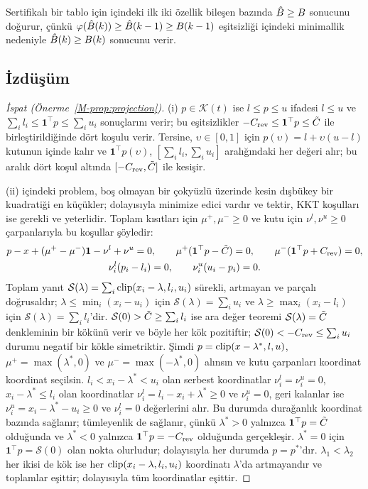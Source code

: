Sertifikalı bir tablo için  içindeki ilk iki özellik bileşen bazında $\hat B\ge B$ sonucunu doğurur, çünkü $\varphi(\hat B(k))\ge\hat B(k-1)\ge B(k-1)$ eşitsizliği  içindeki minimallik nedeniyle $\hat B(k)\ge B(k)$ sonucunu verir.

\subsection{İzdüşüm}\label{app:projection}

\begin{proof}[İspat (Önerme~\ref{M-prop:projection})]
(i) $p\in\mathcal K(t)$ ise $l\le p\le u$ ifadesi $l\le u$ ve $\sum_il_i\le\mathbf 1^\top p\le\sum_iu_i$ sonuçlarını verir; bu eşitsizlikler $-C_{\mathrm{rev}}\le\mathbf 1^\top p\le\tilde C$ ile birleştirildiğinde dört koşulu verir.
Tersine, $\upsilon\in[0,1]$ için $p(\upsilon)=l+\upsilon(u-l)$ kutunun içinde kalır ve $\mathbf 1^\top p(\upsilon)$, $[\sum_il_i,\sum_iu_i]$ aralığındaki her değeri alır; bu aralık dört koşul altında $[-C_{\mathrm{rev}},\tilde C]$ ile kesişir.

(ii)  içindeki problem, boş olmayan bir çokyüzlü üzerinde kesin dışbükey bir kuadratiği en küçükler; dolayısıyla minimize edici vardır ve tektir, KKT koşulları ise gerekli ve yeterlidir.
Toplam kısıtları için $\mu^{+},\mu^{-}\ge0$ ve kutu için $\nu^{l},\nu^{u}\ge0$ çarpanlarıyla bu koşullar şöyledir:
\[
\begin{gathered}
p-x+(\mu^{+}-\mu^{-})\mathbf 1-\nu^{l}+\nu^{u}=0,\qquad \mu^{+}(\mathbf 1^\top p-\tilde C)=0,\qquad \mu^{-}(\mathbf 1^\top p+C_{\mathrm{rev}})=0,\\
\nu^{l}_i(p_i-l_i)=0,\qquad \nu^{u}_i(u_i-p_i)=0.
\end{gathered}
\]
Toplam yanıt $\mathcal S(\lambda)=\sum_i\operatorname{clip}(x_i-\lambda,l_i,u_i)$ sürekli, artmayan ve parçalı doğrusaldır; $\lambda\le\min_i(x_i-u_i)$ için $\mathcal S(\lambda)=\sum_iu_i$ ve $\lambda\ge\max_i(x_i-l_i)$ için $\mathcal S(\lambda)=\sum_il_i$'dir.
$\mathcal S(0)>\tilde C\ge\sum_il_i$ ise ara değer teoremi $\mathcal S(\lambda)=\tilde C$ denkleminin bir kökünü verir ve böyle her kök pozitiftir; $\mathcal S(0)<-C_{\mathrm{rev}}\le\sum_iu_i$ durumu negatif bir kökle simetriktir.
Şimdi $p=\operatorname{clip}(x-\lambda^{*},l,u)$, $\mu^{+}=\max(\lambda^{*},0)$ ve $\mu^{-}=\max(-\lambda^{*},0)$ alınsın ve kutu çarpanları koordinat koordinat seçilsin.
$l_i<x_i-\lambda^{*}<u_i$ olan serbest koordinatlar $\nu_i^{l}=\nu_i^{u}=0$, $x_i-\lambda^{*}\le l_i$ olan koordinatlar $\nu_i^{l}=l_i-x_i+\lambda^{*}\ge0$ ve $\nu_i^{u}=0$, geri kalanlar ise $\nu_i^{u}=x_i-\lambda^{*}-u_i\ge0$ ve $\nu_i^{l}=0$ değerlerini alır.
Bu durumda durağanlık koordinat bazında sağlanır; tümleyenlik de sağlanır, çünkü $\lambda^{*}>0$ yalnızca $\mathbf 1^\top p=\tilde C$ olduğunda ve $\lambda^{*}<0$ yalnızca $\mathbf 1^\top p=-C_{\mathrm{rev}}$ olduğunda gerçekleşir.
$\lambda^{*}=0$ için $\mathbf 1^\top p=\mathcal S(0)$ olan nokta olurludur; dolayısıyla her durumda $p=p^{*}$'dır.
$\lambda_1<\lambda_2$ her ikisi de kök ise her $\operatorname{clip}(x_i-\lambda,l_i,u_i)$ koordinatı $\lambda$'da artmayandır ve toplamlar eşittir; dolayısıyla tüm koordinatlar eşittir.
\end{proof}


